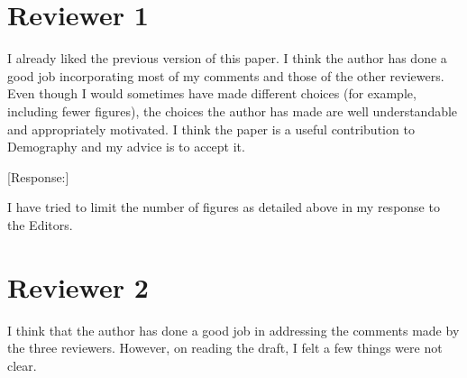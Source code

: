 \documentclass[letterpaper,12pt]{article}
\begin{document}
\newpage

\section*{Reviewer 1}

I already liked the previous version of this paper. I think the author
has done a good job incorporating most of my comments and those of the
other reviewers. Even though I would sometimes have made different
choices (for example, including fewer figures), the choices the author
has made are well understandable and appropriately motivated. I think
the paper is a useful contribution to Demography and my advice is to
accept it.

[Response:]

I have tried to limit the number of figures as detailed above in my response to
the Editors.



\newpage

\section*{Reviewer 2}


I think that the author has done a good job in addressing the comments
made by the three reviewers. However, on reading the draft, I felt a few
things were not clear.
\end{document}
